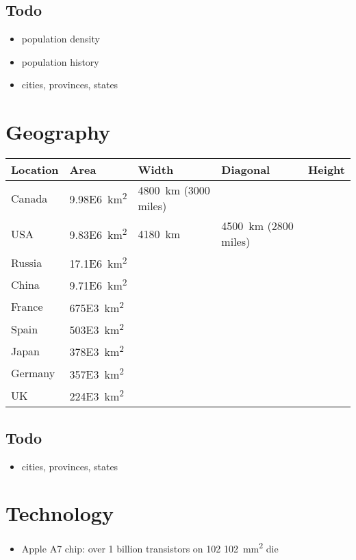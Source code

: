 \documentclass{article}
\begin{document}
\subsection{Todo}
	\begin{itemize}
		\item population density
		\item population history
		\item cities, provinces, states
	\end{itemize}

\section{Geography}
\begin{table}[H]
	\centering
	\begin{tabularx}{\textwidth}{ X X X X X }
		Location & Area & Width & Diagonal & Height \\
		\hline
		Canada & \SI{9.98E6}{\square\km} & \SI{4800}{\km} (3000 miles) & & \\
		USA & \SI{9.83E6}{\square\km} & \SI{4180}{\km} & \SI{4500}{\km} (2800 miles) & \\
		Russia & \SI{17.1E6}{\square\km} & & & \\
		China & \SI{9.71E6}{\square\km} & & & \\
		France & \SI{675E3}{\square\km} & & & \\
		Spain & \SI{503E3}{\square\km} & & & \\
		Japan & \SI{378E3}{\square\km} & & & \\
		Germany & \SI{357E3}{\square\km} & & & \\
		UK & \SI{224E3}{\square\km} & & & \\
	\end{tabularx}
\end{table}
\subsection{Todo}
	\begin{itemize}
		\item cities, provinces, states
	\end{itemize}

\section{Technology}
\begin{itemize}
	\item Apple A7 chip: over 1 billion transistors on 102 \SI{102}{\square\mm} die
\end{itemize}
\end{document}
